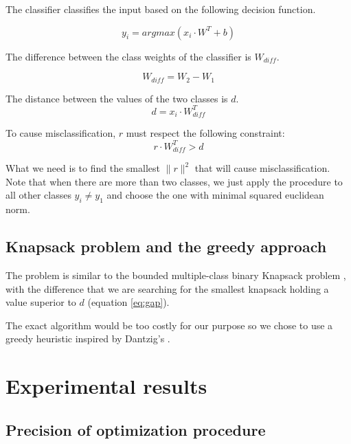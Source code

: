 \documentclass{article} %
\begin{document}
The classifier classifies the input based on the following decision function.

\begin{equation}
\label{eq:decision_function}
  y_i = argmax (x_i \cdot W^T + b)
\end{equation}


The difference between the class weights of the classifier is $W_{diff}$.

\begin{equation}
\label{eq:difference}
  W_{diff} = W_2 - W_1
\end{equation}

The distance between the values of the two classes is $d$.
\begin{equation}
\label{eq:gap}
  d = x_i \cdot W_{diff}^T
\end{equation}


To cause misclassification, $r$ must respect the following constraint:
\begin{equation}
\label{eq:noise_threshold}
  r \cdot W_{diff}^T > d
\end{equation}

What we need is to find the smallest $ \lVert{r} \rVert^2$ that will cause
misclassification. Note that when there are more than two classes, we just
apply the procedure to all other classes $y_i \neq y_1$ and choose the one
with minimal squared euclidean norm.


\subsection{Knapsack problem and the greedy approach}

The problem is similar to the bounded multiple-class binary Knapsack problem
\citep{vanderbeck_extending_2002}, with the difference that we are searching
for the smallest knapsack holding a value superior to $d$ (equation
\ref{eq:gap}).

The exact algorithm would be too costly for our purpose so we chose to use a
greedy heuristic inspired by Dantzig's \citep{dantzig_discrete-variable_1957}.





\section{Experimental results}


\subsection{Precision of optimization procedure}
\end{document}
